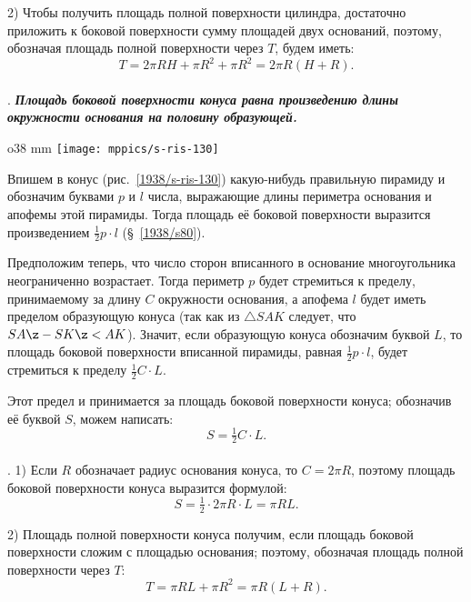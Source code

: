 2) Чтобы получить площадь полной поверхности цилиндра, достаточно приложить к боковой поверхности сумму площадей двух оснований, поэтому, обозначая площадь полной поверхности через $T$, будем иметь:
\[T= 2\pi RH + \pi R^2 + \pi R^2 = 2\pi R(H + R).\]

\paragraph{}\label{1938/s114}
.
\textbf{\emph{Площадь боковой поверхности конуса равна произведению длины окружности основания на половину образующей.}}

\begin{wrapfigure}{o}{38 mm}
\vskip-0mm
\centering
\texttt{[image: mppics/s-ris-130]}
\caption{}\label{1938/s-ris-130}
\vskip-0mm
\end{wrapfigure}

Впишем в конус (рис.~\ref{1938/s-ris-130}) какую-нибудь правильную пирамиду и обозначим буквами $p$ и $l$ числа, выражающие длины периметра основания и апофемы этой пирамиды.
Тогда площадь её боковой поверхности выразится произведением $\tfrac12 p\cdot l$ (§~\ref{1938/s80}).

Предположим теперь, что число сторон вписанного в основание многоугольника неограниченно возрастает.
Тогда периметр $p$ будет стремиться к пределу, принимаемому за длину $C$ окружности основания, а апофема $l$ будет иметь пределом образующую конуса (так как из $\triangle SAK$ следует, что $SA\z-SK\z<AK$).
Значит, если образующую конуса обозначим буквой $L$, то площадь боковой поверхности вписанной пирамиды, равная $\tfrac12 p\cdot l$, будет стремиться к пределу $\tfrac12 C\cdot L$. 

Этот предел и принимается за площадь боковой поверхности конуса; обозначив её буквой $S$, можем написать:
\[S = \tfrac12 C\cdot L.\]

\paragraph{}\label{1938/s115}
. 1) Если $R$ обозначает радиус основания конуса, то $C= 2\pi R$, поэтому площадь боковой поверхности конуса выразится формулой:
\[S
= \tfrac12 \cdot 2\pi R \cdot L
=\pi RL.\]

2) Площадь полной поверхности конуса получим, если площадь боковой поверхности сложим с площадью основания;
поэтому, обозначая площадь полной поверхности через $T$:
\[T= \pi RL + \pi R^2 = \pi R(L + R).\]

